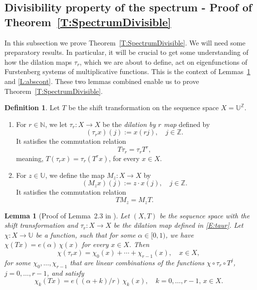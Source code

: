 \documentclass[11pt]{amsart}
\newtheorem{lemma}{Lemma}[section]
\theoremstyle{definition}
\newtheorem{definition}{Definition}[section]
\newcommand{\N}{{\mathbb N}}
\newcommand{\Z}{{\mathbb Z}}
\newcommand{\U}{{\mathbb U}}
\begin{document}
\subsection{Divisibility property of the spectrum - Proof of Theorem~\ref{T:SpectrumDivisible}}\label{SS:ProofThm2.1}
In this subsection we prove  	Theorem~\ref{T:SpectrumDivisible}. We will need some preparatory results. In particular,  it will be crucial to get some understanding of
how the dilation maps $\tau_r$, which we are about to define, act on eigenfunctions of Furstenberg systems of multiplicative functions. This  is the context of Lemmas~\ref{L:taurchi} and \ref{L:abscont}.   	These two lemmas combined enable us to prove Theorem~\ref{T:SpectrumDivisible}.
\begin{definition}
	Let  $T$ be the shift transformation on the sequence space  $X=\U^\Z$.
	\begin{enumerate}
		\item
	For $r\in \N$, we let $\tau_r\colon X\to X$ be the {\em dilation by $r$ map} defined by
	\begin{equation}\label{E:taur}
		(\tau_rx)(j):=x(rj), \quad j\in \Z.
	\end{equation}
	It satisfies the commutation relation
	\begin{equation}\label{E:Ttaur}
		T\tau_r=\tau_rT^r,
	\end{equation}
	meaning,  $T(\tau_r x)=\tau_r(T^rx)$, for every $x\in X$.
	
	\smallskip

\item For $z\in \U$, we define the map $M_z\colon X\to X$ by
\begin{equation}\label{E:Mz}
	(M_zx)(j):=z\cdot x(j), \quad j\in \Z.
	\end{equation}
	It satisfies the commutation relation
	\begin{equation}\label{E:TMz}
	TM_z=M_zT.
\end{equation}
	\end{enumerate}
\end{definition}
\begin{lemma}[Proof of Lemma~2.3 in \cite{Jen97}]\label{L:taurchi}
	Let $(X,T)$ be the sequence space with the shift transformation and $\tau_r\colon X\to X$ be the dilation map defined in \eqref{E:taur}.   Let  $\chi\colon X\to \U$ be a function, such that
 for some $\alpha\in [0,1)$, we have $\chi(Tx)= e(\alpha)\, \chi(x)$ for  every $x\in X$.
	  Then
	$$
	 \chi(\tau_rx)=\chi_0(x)+\cdots+\chi_{r-1}(x), \quad x\in X,
	$$  for some $\chi_0,\ldots, \chi_{r-1}$   that are linear combinations of the functions $\chi\circ\tau_r\circ T^j$, $j=0,\ldots, r-1$, and  satisfy
	$$
	\chi_k(Tx)= e((\alpha+k)/r)\, \chi_k(x),\quad k=0,\ldots,r-1,\,  x\in X.
	$$
\end{lemma}
\end{document}
